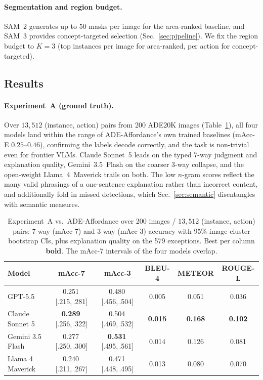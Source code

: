 \documentclass[runningheads]{llncs}
\begin{document}
\paragraph{Segmentation and region budget.}
SAM~2 generates up to 50 masks per image for the area-ranked baseline, and SAM~3 provides concept-targeted selection (Sec.~\ref{sec:pipeline}). 
We fix the region budget to $K=3$ (top instances per image for area-ranked, per action for concept-targeted).

\subsection{Results}
\label{sec:results}

\paragraph{Experiment~A (ground truth).}
Over $13{,}512$ (instance, action) pairs from 200 ADE20K images (Table~\ref{tab:expA}), all four models land within the range of ADE-Affordance's own trained baselines (mAcc-E $0.25$--$0.46$), confirming the labels decode correctly, and the task is non-trivial even for frontier VLMs.
Claude Sonnet~5 leads on the typed 7-way judgment and explanation quality, Gemini~3.5~Flash on the coarser 3-way collapse, and the open-weight Llama~4~Maverick trails on both.
The low $n$-gram scores reflect the many valid phrasings of a one-sentence explanation rather than incorrect content, and additionally fold in missed detections, which Sec.~\ref{sec:semantic} disentangles with semantic measures.

\begin{table}[t]
  \centering
  \footnotesize
  \caption{Experiment~A vs.\ ADE-Affordance over 200 images / $13{,}512$ (instance, action) pairs: 7-way (mAcc-7) and 3-way (mAcc-3) accuracy with 95\% image-cluster bootstrap CIs, plus explanation quality on the 579 exceptions. Best per column \textbf{bold}. The mAcc-7 intervals of the four models overlap.}
  \label{tab:expA}
  \begin{tabular}{lccccc}
    \toprule
    Model & mAcc-7 & mAcc-3 & BLEU-4 & METEOR & ROUGE-L \\
    \midrule
    GPT-5.5           & 0.251\,{\scriptsize[.215,\,.281]} & 0.480\,{\scriptsize[.456,\,.504]} & 0.005 & 0.051 & 0.036 \\
    Claude Sonnet 5   & \textbf{0.289}\,{\scriptsize[.256,\,.322]} & 0.504\,{\scriptsize[.469,\,.532]} & \textbf{0.015} & \textbf{0.168} & \textbf{0.102} \\
    Gemini 3.5 Flash  & 0.277\,{\scriptsize[.250,\,.300]} & \textbf{0.531}\,{\scriptsize[.495,\,.561]} & 0.014 & 0.126 & 0.081 \\
    Llama 4 Maverick  & 0.240\,{\scriptsize[.211,\,.267]} & 0.471\,{\scriptsize[.448,\,.495]} & 0.013 & 0.080 & 0.070 \\
    \bottomrule
  \end{tabular}
\end{table}
\end{document}
